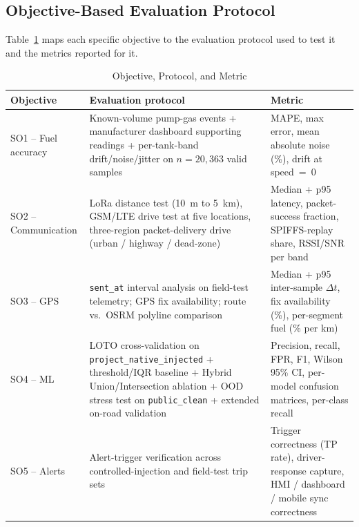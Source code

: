 \subsection{Objective-Based Evaluation Protocol}

Table~\ref{tab:objective_protocol_metric} maps each specific objective to the evaluation protocol used to test it and the metrics reported for it.

\addtocounter{table}{-1}
\begin{table}[!htbp]
\centering
\caption{Objective, Protocol, and Metric}
\label{tab:objective_protocol_metric}
\scriptsize
\setlength{\tabcolsep}{3pt}
\renewcommand{\arraystretch}{1.20}
\begin{tabularx}{\textwidth}{|p{}|X|p{}|}
\hline
\textbf{Objective} & \textbf{Evaluation protocol} & \textbf{Metric} \\
\hline
SO1 -- Fuel accuracy & Known-volume pump-gas events + manufacturer dashboard supporting readings + per-tank-band drift/noise/jitter on $n = 20{,}363$ valid samples & MAPE, max error, mean absolute noise (\%), drift at speed~=~0 \\
\hline
SO2 -- Communication & LoRa distance test (10~m to 5~km), GSM/LTE drive test at five locations, three-region packet-delivery drive (urban / highway / dead-zone) & Median + p95 latency, packet-success fraction, SPIFFS-replay share, RSSI/SNR per band \\
\hline
SO3 -- GPS & \texttt{sent\_at} interval analysis on field-test telemetry; GPS fix availability; route vs.\ OSRM polyline comparison & Median + p95 inter-sample $\Delta t$, fix availability (\%), per-segment fuel (\% per km) \\
\hline
SO4 -- ML & LOTO cross-validation on \texttt{project\_native\_\allowbreak injected} + threshold/IQR baseline + Hybrid Union/Intersection ablation + OOD stress test on \texttt{public\_clean} + extended on-road validation & Precision, recall, FPR, F1, Wilson 95\% CI, per-model confusion matrices, per-class recall \\
\hline
SO5 -- Alerts & Alert-trigger verification across controlled-injection and field-test trip sets & Trigger correctness (TP rate), driver-response capture, HMI / dashboard / mobile sync correctness \\
\hline
\end{tabularx}
\normalsize
\end{table}

